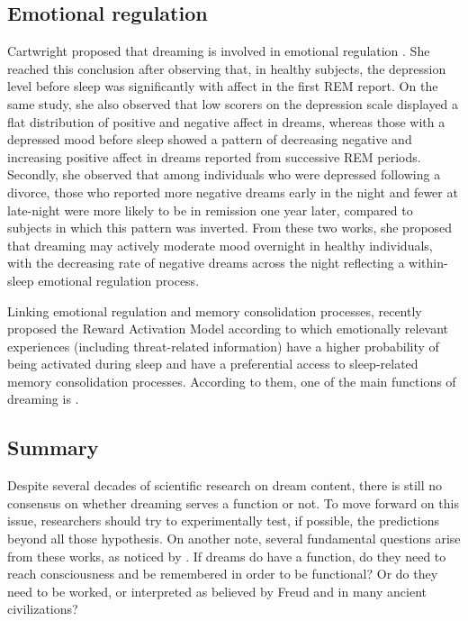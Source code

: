 \subsection{Emotional regulation}
\label{sec:dream-func:modern:emotion}

Cartwright proposed that dreaming is involved in emotional regulation \citep{cartwright_role_1998, cartwright_role_1998-1}. She reached this conclusion after observing that, in healthy subjects, the depression level before sleep was significantly with affect in the first REM report. On the same study, she also observed that low scorers on the depression scale displayed a flat distribution of positive and negative affect in dreams, whereas those with a depressed mood before sleep showed a pattern of decreasing negative and increasing positive affect in dreams reported from successive REM periods. Secondly, she observed that among individuals who were depressed following a divorce, those who reported more negative dreams early in the night and fewer at late-night were more likely to be in remission one year later, compared to subjects in which this pattern was inverted. From these two works, she proposed that dreaming may actively moderate mood overnight in healthy individuals, with the decreasing rate of negative dreams across the night reflecting a within-sleep emotional regulation process.

Linking emotional regulation and memory consolidation processes, \citet{perogamvros_roles_2012} recently proposed the Reward Activation Model according to which emotionally relevant experiences (including threat-related information) have a higher probability of being activated during sleep and have a preferential access to sleep-related memory consolidation processes. According to them, one of the main functions of dreaming is  \citep{meerlo_sleep_2013}.

\subsection{Summary}
\label{sec:dream-func:modern:summary}

Despite several decades of scientific research on dream content, there is still no consensus on whether dreaming serves a function or not. To move forward on this issue, researchers should try to experimentally test, if possible, the predictions beyond all those hypothesis.
On another note, several fundamental questions arise from these works, as noticed by \citet{de_koninck_sleep_2012}. If dreams do have a function, do they need to reach consciousness and be remembered in order to be functional? Or do they need to be worked, or interpreted as believed by Freud and in many ancient civilizations?

